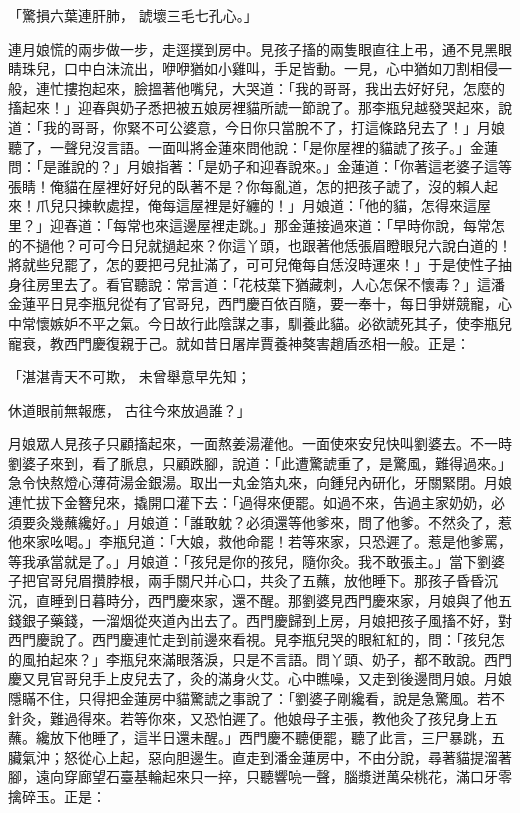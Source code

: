 「驚損六葉連肝肺，  諕壞三毛七孔心。」

連月娘慌的兩步做一步，走逕撲到房中。見孩子搐的兩隻眼直往上弔，通不見黑眼睛珠兒，口中白沫流出，咿咿猶如小雞叫，手足皆動。一見，心中猶如刀割相侵一般，連忙摟抱起來，臉搵著他嘴兒，大哭道：「我的哥哥，我出去好好兒，怎麼的搐起來！」迎春與奶子悉把被五娘房裡貓所諕一節說了。那李瓶兒越發哭起來，說道：「我的哥哥，你緊不可公婆意，今日你只當脫不了，打這條路兒去了！」月娘聽了，一聲兒沒言語。一面叫將金蓮來問他說：「是你屋裡的貓諕了孩子。」金蓮問：「是誰說的？」月娘指著：「是奶子和迎春說來。」金蓮道：「你著這老婆子這等張睛！俺貓在屋裡好好兒的臥著不是？你每亂道，怎的把孩子諕了，沒的賴人起來！爪兒只揀軟處捏，俺每這屋裡是好纏的！」月娘道：「他的貓，怎得來這屋里？」迎春道：「每常也來這邊屋裡走跳。」那金蓮接過來道：「早時你說，每常怎的不撾他？可可今日兒就撾起來？你這丫頭，也跟著他恁張眉瞪眼兒六說白道的！將就些兒罷了，怎的要把弓兒扯滿了，可可兒俺每自恁沒時運來！」于是使性子抽身往房里去了。看官聽說：常言道：「花枝葉下猶藏刺，人心怎保不懷毒？」這潘金蓮平日見李瓶兒從有了官哥兒，西門慶百依百隨，要一奉十，每日爭姘競寵，心中常懷嫉妒不平之氣。今日故行此陰謀之事，馴養此貓。必欲諕死其子，使李瓶兒寵衰，教西門慶復親于己。就如昔日屠岸賈養神獒害趙盾丞相一般。正是：

「湛湛青天不可欺，  未曾舉意早先知；

休道眼前無報應，  古往今來放過誰？」

月娘眾人見孩子只顧搐起來，一面熬姜湯灌他。一面使來安兒快叫劉婆去。不一時劉婆子來到，看了脈息，只顧跌腳，說道：「此遭驚諕重了，是驚風，難得過來。」急令快熬燈心薄荷湯金銀湯。取出一丸金箔丸來，向鍾兒內研化，牙關緊閉。月娘連忙拔下金簪兒來，撬開口灌下去：「過得來便罷。如過不來，告過主家奶奶，必須要灸幾蘸纔好。」月娘道：「誰敢躭？必須還等他爹來，問了他爹。不然灸了，惹他來家吆喝。」李瓶兒道：「大娘，救他命罷！若等來家，只恐遲了。惹是他爹罵，等我承當就是了。」月娘道：「孩兒是你的孩兒，隨你灸。我不敢張主。」當下劉婆子把官哥兒眉攢脖根，兩手關尺并心口，共灸了五蘸，放他睡下。那孩子昏昏沉沉，直睡到日暮時分，西門慶來家，還不醒。那劉婆見西門慶來家，月娘與了他五錢銀子藥錢，一溜烟從夾道內出去了。西門慶歸到上房，月娘把孩子風搐不好，對西門慶說了。西門慶連忙走到前邊來看視。見李瓶兒哭的眼紅紅的，問：「孩兒怎的風拍起來？」李瓶兒來滿眼落淚，只是不言語。問丫頭、奶子，都不敢說。西門慶又見官哥兒手上皮兒去了，灸的滿身火艾。心中瞧噪，又走到後邊問月娘。月娘隱瞞不住，只得把金蓮房中貓驚諕之事說了：「劉婆子剛纔看，說是急驚風。若不針灸，難過得來。若等你來，又恐怕遲了。他娘母子主張，教他灸了孩兒身上五蘸。纔放下他睡了，這半日還未醒。」西門慶不聽便罷，聽了此言，三尸暴跳，五臟氣沖；怒從心上起，惡向胆邊生。直走到潘金蓮房中，不由分說，尋著貓提溜著腳，遠向穿廊望石臺基輪起來只一捽，只聽響喨一聲，腦漿迸萬朵桃花，滿口牙零擒碎玉。正是：


